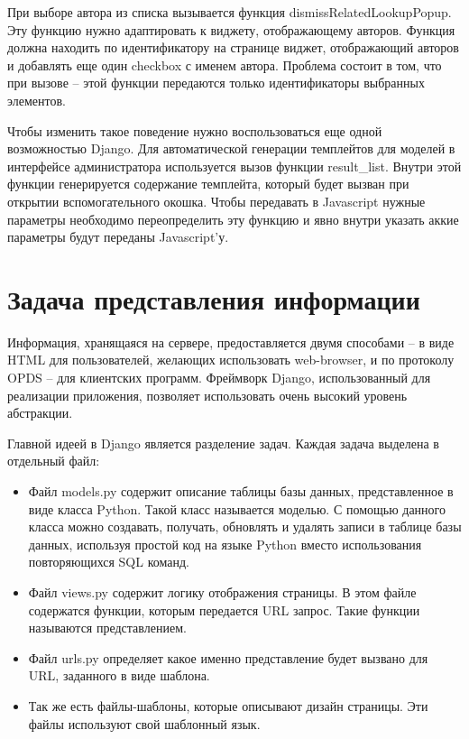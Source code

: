 \documentclass[a4paper, 12pt]{report}
\begin{document}
При выборе автора из списка вызывается функция dismissRelatedLookupPopup. Эту функцию нужно адаптировать к виджету, отображающему авторов. Функция должна находить по идентификатору на странице виджет, отображающий авторов и добавлять еще один checkbox с именем автора. Проблема состоит в том, что при вызове -- этой функции передаются только идентификаторы выбранных элементов. 

Чтобы изменить такое поведение нужно воспользоваться еще одной возможностью Django. Для автоматической генерации темплейтов для моделей в интерфейсе администратора используется вызов функции result\_list. Внутри этой функции генерируется содержание темплейта, который будет вызван при открытии вспомогательного окошка. Чтобы передавать в Javascript нужные параметры необходимо переопределить эту функцию и явно внутри указать аккие параметры будут переданы Javascript'у.

\newpage
\section{ Задача представления информации}

Информация, хранящаяся на сервере, предоставляется двумя способами -- в виде HTML для пользователей, желающих использовать web-browser, и по протоколу OPDS -- для клиентских программ. Фреймворк Django, использованный для реализации приложения, позволяет использовать очень высокий уровень абстракции.

Главной идеей в Django является разделение задач. Каждая задача выделена в отдельный файл:
\begin{itemize}
	\item Файл models.py содержит описание таблицы базы данных, представленное в виде класса Python. Такой класс называется моделью. С помощью данного класса можно создавать, получать, обновлять и удалять записи в таблице базы данных, используя простой код на языке Python вместо использования повторяющихся SQL команд.
	\item Файл views.py содержит логику отображения страницы. В этом файле содержатся функции, которым передается URL запрос. Такие функции называются представлением.
	\item Файл urls.py определяет какое именно представление будет вызвано для URL, заданного в виде шаблона. 
	\item Так же есть файлы-шаблоны, которые описывают дизайн страницы. Эти файлы используют свой шаблонный язык.
\end{itemize}
\end{document}
